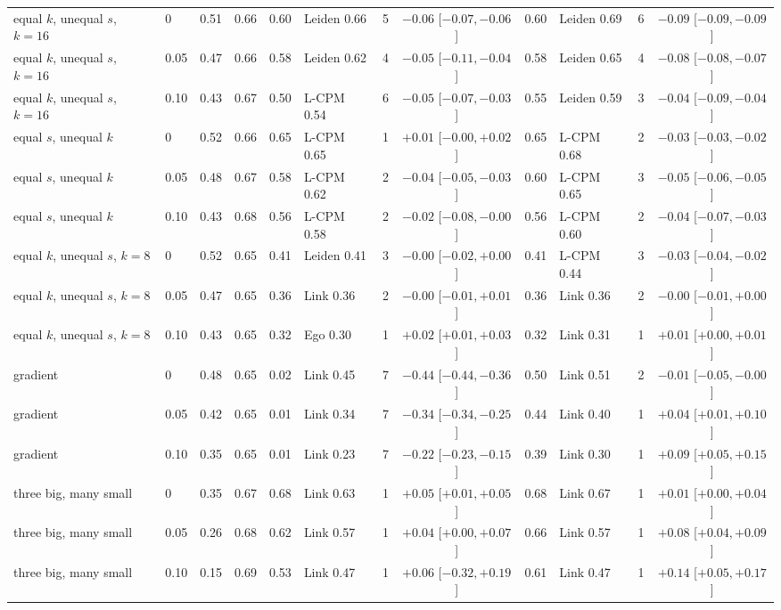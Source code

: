 \begin{table}[p]
\begin{ruledtabular}
\begin{tabular}{llcc|cl r c|cl r c}
equal $k$, unequal $s$, $k=16$ & 0 & 0.51 & 0.66 & 0.60 & Leiden 0.66 & 5 & $-0.06$ [$-0.07,-0.06$] & 0.60 & Leiden 0.69 & 6 & $-0.09$ [$-0.09,-0.09$] \\
equal $k$, unequal $s$, $k=16$ & 0.05 & 0.47 & 0.66 & 0.58 & Leiden 0.62 & 4 & $-0.05$ [$-0.11,-0.04$] & 0.58 & Leiden 0.65 & 4 & $-0.08$ [$-0.08,-0.07$] \\
equal $k$, unequal $s$, $k=16$ & 0.10 & 0.43 & 0.67 & 0.50 & L-CPM 0.54 & 6 & $-0.05$ [$-0.07,-0.03$] & 0.55 & Leiden 0.59 & 3 & $-0.04$ [$-0.09,-0.04$] \\
equal $s$, unequal $k$ & 0 & 0.52 & 0.66 & 0.65 & L-CPM 0.65 & 1 & $+0.01$ [$-0.00,+0.02$] & 0.65 & L-CPM 0.68 & 2 & $-0.03$ [$-0.03,-0.02$] \\
equal $s$, unequal $k$ & 0.05 & 0.48 & 0.67 & 0.58 & L-CPM 0.62 & 2 & $-0.04$ [$-0.05,-0.03$] & 0.60 & L-CPM 0.65 & 3 & $-0.05$ [$-0.06,-0.05$] \\
equal $s$, unequal $k$ & 0.10 & 0.43 & 0.68 & 0.56 & L-CPM 0.58 & 2 & $-0.02$ [$-0.08,-0.00$] & 0.56 & L-CPM 0.60 & 2 & $-0.04$ [$-0.07,-0.03$] \\
equal $k$, unequal $s$, $k=8$ & 0 & 0.52 & 0.65 & 0.41 & Leiden 0.41 & 3 & $-0.00$ [$-0.02,+0.00$] & 0.41 & L-CPM 0.44 & 3 & $-0.03$ [$-0.04,-0.02$] \\
equal $k$, unequal $s$, $k=8$ & 0.05 & 0.47 & 0.65 & 0.36 & Link 0.36 & 2 & $-0.00$ [$-0.01,+0.01$] & 0.36 & Link 0.36 & 2 & $-0.00$ [$-0.01,+0.00$] \\
equal $k$, unequal $s$, $k=8$ & 0.10 & 0.43 & 0.65 & 0.32 & Ego 0.30 & 1 & $+0.02$ [$+0.01,+0.03$] & 0.32 & Link 0.31 & 1 & $+0.01$ [$+0.00,+0.01$] \\
gradient & 0 & 0.48 & 0.65 & 0.02 & Link 0.45 & 7 & $-0.44$ [$-0.44,-0.36$] & 0.50 & Link 0.51 & 2 & $-0.01$ [$-0.05,-0.00$] \\
gradient & 0.05 & 0.42 & 0.65 & 0.01 & Link 0.34 & 7 & $-0.34$ [$-0.34,-0.25$] & 0.44 & Link 0.40 & 1 & $+0.04$ [$+0.01,+0.10$] \\
gradient & 0.10 & 0.35 & 0.65 & 0.01 & Link 0.23 & 7 & $-0.22$ [$-0.23,-0.15$] & 0.39 & Link 0.30 & 1 & $+0.09$ [$+0.05,+0.15$] \\
three big, many small & 0 & 0.35 & 0.67 & 0.68 & Link 0.63 & 1 & $+0.05$ [$+0.01,+0.05$] & 0.68 & Link 0.67 & 1 & $+0.01$ [$+0.00,+0.04$] \\
three big, many small & 0.05 & 0.26 & 0.68 & 0.62 & Link 0.57 & 1 & $+0.04$ [$+0.00,+0.07$] & 0.66 & Link 0.57 & 1 & $+0.08$ [$+0.04,+0.09$] \\
three big, many small & 0.10 & 0.15 & 0.69 & 0.53 & Link 0.47 & 1 & $+0.06$ [$-0.32,+0.19$] & 0.61 & Link 0.47 & 1 & $+0.14$ [$+0.05,+0.17$] \\

\end{tabular}
\end{ruledtabular}
\end{table}
